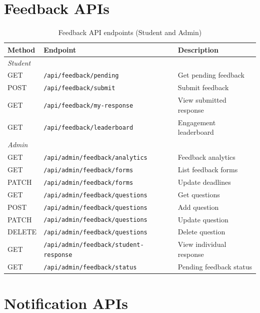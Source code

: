 \section{Feedback APIs}

\begin{table}[!ht]
    \centering
    \begin{tabular}{|l|l|p{5.5cm}|}
    \hline
    \textbf{Method} & \textbf{Endpoint} & \textbf{Description} \\ \hline
    \multicolumn{3}{|l|}{\textit{Student}} \\ \hline
    GET  & \texttt{/api/feedback/pending}      & Get pending feedback \\
    POST & \texttt{/api/feedback/submit}       & Submit feedback \\
    GET  & \texttt{/api/feedback/my-response}  & View submitted response \\
    GET  & \texttt{/api/feedback/leaderboard}  & Engagement leaderboard \\ \hline
    \multicolumn{3}{|l|}{\textit{Admin}} \\ \hline
    GET    & \texttt{/api/admin/feedback/analytics}       & Feedback analytics \\
    GET    & \texttt{/api/admin/feedback/forms}           & List feedback forms \\
    PATCH  & \texttt{/api/admin/feedback/forms}           & Update deadlines \\
    GET    & \texttt{/api/admin/feedback/questions}       & Get questions \\
    POST   & \texttt{/api/admin/feedback/questions}       & Add question \\
    PATCH  & \texttt{/api/admin/feedback/questions}       & Update question \\
    DELETE & \texttt{/api/admin/feedback/questions}       & Delete question \\
    GET    & \texttt{/api/admin/feedback/student-response}& View individual response \\
    GET    & \texttt{/api/admin/feedback/status}          & Pending feedback status \\ \hline
    \end{tabular}
    \caption{Feedback API endpoints (Student and Admin)}
    \label{tab:api_feedback}
\end{table}

\section{Notification APIs}

